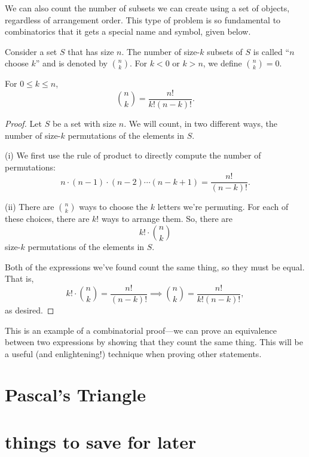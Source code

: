 \documentclass[../m55main.tex]{subfiles}
\begin{document}
We can also count the number of subsets we can create using a set of objects, regardless of arrangement order.
This type of problem is so fundamental to combinatorics that it gets a special name and symbol, given below.

\begin{definition}[Combination]
    Consider a set $S$ that has size $n$.
    The number of size-$k$ subsets of $S$ is called ``$n$ choose $k$'' and is denoted by ${n \choose k}$.
    For $k < 0$ or $k > n$, we define ${n \choose k} = 0$.
\end{definition}

\begin{theorem}
    For $0 \leq k \leq n$,
    \[ {n \choose k} = \frac{n!}{k! (n-k)!}. \]
\end{theorem}

\begin{proof}
    Let $S$ be a set with size $n$.
    We will count, in two different ways, the number of size-$k$ permutations of the elements in $S$.
    \smallskip

    (i) We first use the rule of product to directly compute the number of permutations:
    \[ n \cdot (n-1) \cdot (n-2) \cdots (n-k+1) = \frac{n!}{(n-k)!}. \]

    (ii) There are ${n \choose k}$ ways to choose the $k$ letters we're permuting.
    For each of these choices, there are $k!$ ways to arrange them.
    So, there are
    \[ k! \cdot {n \choose k} \]
    size-$k$ permutations of the elements in $S$.
    \smallskip

    Both of the expressions we've found count the same thing, so they must be equal.
    That is,
    \[ k! \cdot {n \choose k} = \frac{n!}{(n-k)!} \implies {n \choose k} = \frac{n!}{k!(n-k)!}, \]
    as desired.
\end{proof}

This is an example of a combinatorial proof---we can prove an equivalence between two expressions by showing that they count the same thing.
This will be a useful (and enlightening!) technique when proving other statements.

\section{Pascal's Triangle}


\section{things to save for later}
\end{document}
